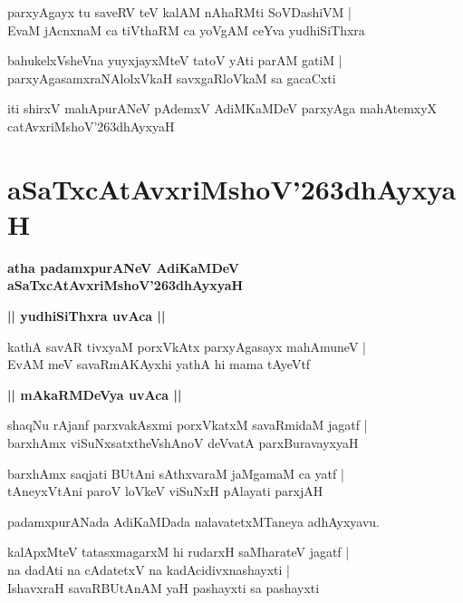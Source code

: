 \documentclass[twoside,12pt,openright]{book}
\def\S{\char'263}
\newcounter{shloka}[chapter]
\def\uvaca#1{\centerline{{\large\textbf{#1}}}}
\begin{document}
\begin{shloka}
parxyAgayx tu saveRV teV kalAM nAhaRMti SoVDashiVM |\\
EvaM jAcnxnaM ca tiVthaRM ca yoVgAM ceYva yudhiSiThxra
\end{shloka}

\begin{shloka}
bahukelxVsheVna yuyxjayxMteV tatoV yAti parAM gatiM |\\
parxyAgasamxraNAlolxVkaH savxgaRloVkaM sa gacaCxti 
\end{shloka}

\begin{center}
iti shirxV mahApurANeV pAdemxV AdiMKaMDeV parxyAga mahAtemxyX catAvxriMshoV\S dhAyxyaH 
\end{center}


\chapter{aSaTxcAtAvxriMshoV\S dhAyxyaH}

\begin{center}
{\LARGE\bfseries atha padamxpurANeV AdiKaMDeV aSaTxcAtAvxriMshoV\S dhAyxyaH}
\end{center}

\uvaca{|| yudhiSiThxra uvAca ||}

\begin{shloka}
kathA savAR tivxyaM porxVkAtx parxyAgasayx mahAmuneV |\\
EvAM meV savaRmAKAyxhi yathA hi mama tAyeVtf 
\end{shloka}

\uvaca{|| mAkaRMDeVya uvAca ||}

\begin{shloka}
shaqNu rAjanf parxvakAsxmi porxVkatxM savaRmidaM jagatf |\\
barxhAmx viSuNxsatxtheVshAnoV deVvatA parxBuravayxyaH 
\end{shloka}

\begin{shloka}
barxhAmx saqjati BUtAni sAthxvaraM jaMgamaM ca yatf |\\
tAneyxVtAni paroV loVkeV  viSuNxH pAlayati parxjAH
\end{shloka}

\begin{center}
padamxpurANada AdiKaMDada nalavatetxMTaneya adhAyxyavu.
\end{center}

\begin{shloka}
kalApxMteV tatasxmagarxM hi rudarxH saMharateV jagatf |\\
na dadAti na cAdatetxV na kadAcidivxnashayxti |\\
IshavxraH savaRBUtAnAM yaH pashayxti sa pashayxti 
\end{shloka}
\end{document}
